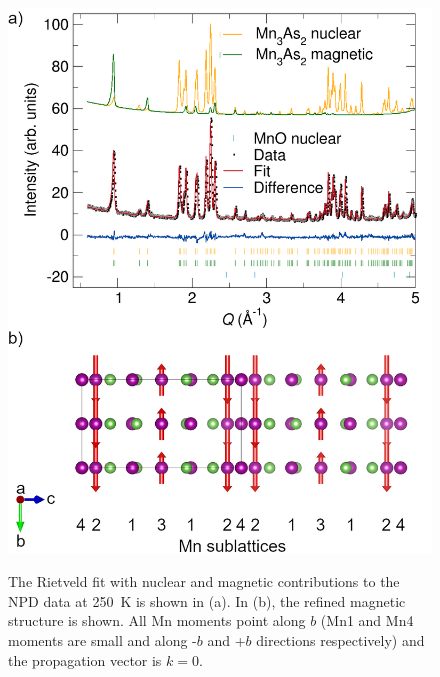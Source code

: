 \documentclass[letterpaper,10pt,doublespacing,edeposit]{uiucthesis2020}
\begin{document}
\begin{mainmatter}
\begin{figure}
\centering\includegraphics[width=0.75\columnwidth]{figures/ch6/250K_mag_structure.png} \\
\caption{The Rietveld fit with nuclear and magnetic contributions to the NPD data at 250~K is shown in (a). In (b), the refined magnetic structure is shown. All Mn moments point along $b$ (Mn1 and Mn4 moments are small and along -$b$ and +$b$ directions respectively) and the propagation vector is $k = 0$. 
}
\label{fig:250K_data}
\end{figure}


\end{mainmatter}
\end{document}
